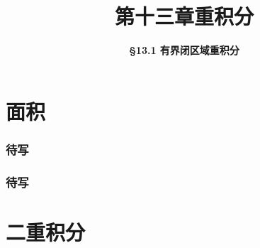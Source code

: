 \everymath{\displaystyle}



\title[第十三章\\
重积分]{\texorpdfstring{\LARGE \bfseries 第十三章\quad 重积分}{第十三章 重积分}} %
\author[\smaller \S 13.1\\
有界闭区域重积分] %
{\Large \bfseries \S 13.1 有界闭区域重积分}
\date{}





\begin{frame}

\titlepage %

\end{frame}



\section{面积}


\begin{frame}
\frametitle{待写}

\end{frame}


\begin{frame}
\frametitle{待写}

\end{frame}


\section{二重积分}


